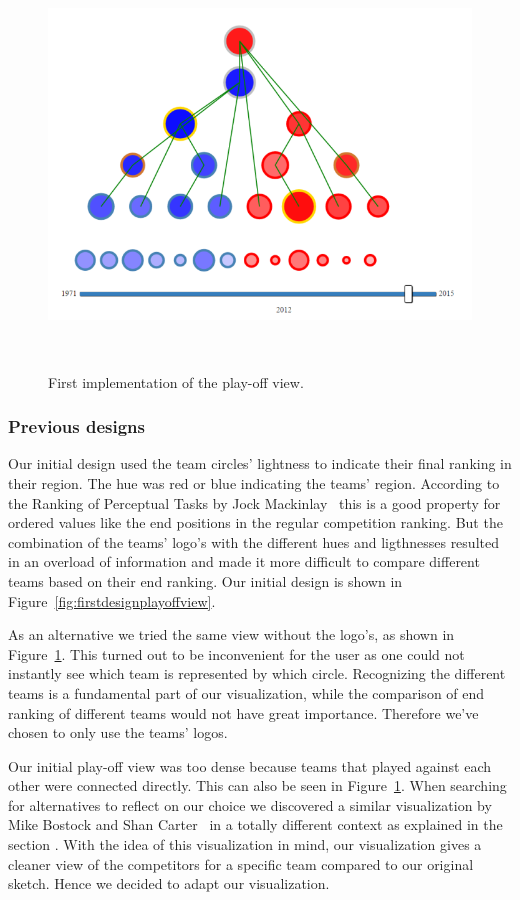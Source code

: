 \documentclass[]{sigchi}
\begin{document}
\begin{figure}
\centering
  \includegraphics[width=0.9\columnwidth]{figures/playoffviewfirstimplemantation}
  \caption{First implementation of the play-off view.}~	
  \label{fig:playoffviewfirstimplemantation}
\end{figure}


\subsubsection{Previous designs}
Our initial design used the team circles' lightness to indicate their final
ranking in their region. The hue was red or blue indicating the teams' region.
According to the Ranking of Perceptual Tasks by Jock Mackinlay~\cite{automatingdesign} this is a good property for ordered values like the end positions in the regular competition ranking. But the combination of the teams' logo's with the different hues and ligthnesses resulted in an overload of information and made it more difficult to compare different teams based on their end ranking. Our initial design is shown in Figure~\ref{fig:firstdesignplayoffview}.

As an alternative we tried the same view without the logo's, as shown in Figure~\ref{fig:playoffviewfirstimplemantation}. This turned out to be inconvenient for the user as one could not instantly see which team is represented by which circle. Recognizing the different teams is a fundamental part of our visualization, while the comparison of end ranking of different teams would not have great importance. Therefore we've chosen to only use the teams' logos.

Our initial play-off view was too dense because teams that played against each other were connected directly. This can also be seen in Figure~\ref{fig:playoffviewfirstimplemantation}. When searching for alternatives to reflect on our choice we discovered a similar visualization by Mike Bostock and Shan Carter~\cite{whitehousepath} in a totally different context as explained in the section . With the idea of this visualization in mind, our visualization gives a cleaner view of the competitors for a specific team compared to our original sketch. Hence we decided to adapt our visualization.
\end{document}
